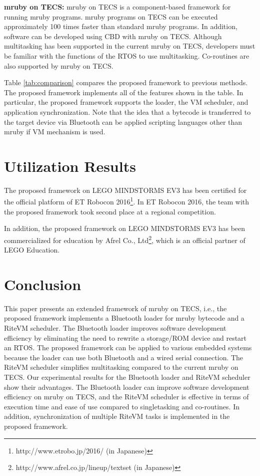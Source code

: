 \documentclass[S,R,E]{article/compsoft}
\begin{document}
{\bf mruby on TECS:} mruby on TECS is a component-based framework for running mruby programs.
mruby programs on TECS can be executed approximately 100 times faster than standard mruby programs.
In addition, software can be developed using CBD with mruby on TECS.
Although multitasking has been supported in the current mruby on TECS, developers must be familiar with the functions of the RTOS to use multitasking.
Co-routines are also supported by mruby on TECS.

Table \ref{tab:comparison} compares the proposed framework to previous methods.
The proposed framework implements all of the features shown in the table.
In particular, the proposed framework supports the loader, the VM scheduler, and application synchronization.
Note that the idea that a bytecode is transferred to the target device via Bluetooth can be applied scripting languages other than mruby if VM mechanism is used.
 
\section{Utilization Results}
\label{sec:Results}
The proposed framework on LEGO MINDSTORMS EV3 \cite{url:download} has been certified for the official platform of ET Robocon 2016\footnote{http://www.etrobo.jp/2016/ (in Japanese)}.
In ET Robocon 2016, the team with the proposed framework took second place at a regional competition.

In addition, the proposed framework on LEGO MINDSTORMS EV3 has been commercialized for education by Afrel Co., Ltd\footnote{http://www.afrel.co.jp/lineup/textset (in Japanese)}, which is an official partner of LEGO Education.

\section{Conclusion}
\label{sec:Conclusion}
This paper presents an extended framework of mruby on TECS, i.e., the proposed framework implements a Bluetooth loader for mruby bytecode and a RiteVM scheduler.
The Bluetooth loader improves software development efficiency by eliminating the need to rewrite a storage/ROM device and restart an RTOS.
The proposed framework can be applied to various embedded systems because the loader can use both Bluetooth and a wired serial connection.
The RiteVM scheduler simplifies multitasking compared to the current mruby on TECS.
Our experimental results for the Bluetooth loader and RiteVM scheduler show their advantages.
The Bluetooth loader can improve software development efficiency on mruby on TECS, and the RiteVM scheduler is effective in terms of execution time and ease of use compared to singletasking and co-routines.
In addition, synchronization of multiple RiteVM tasks is implemented in the proposed framework.
\end{document}
